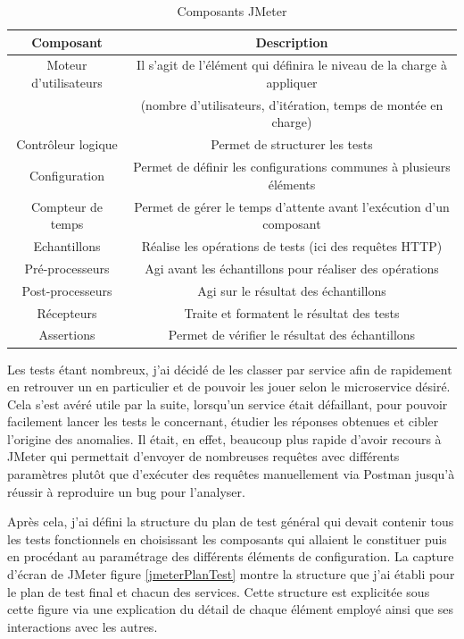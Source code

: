 \begin{table}[h!]
	\center
	\begin{tabular}{| c | c |}
     \hline
     Composant & Description \\ \hline
     Moteur d’utilisateurs & Il s’agit de l’élément qui définira le niveau de la charge à appliquer \\ & (nombre d’utilisateurs, d’itération, temps de montée en charge) \\ \hline
     Contrôleur logique & Permet de structurer les tests \\ \hline
     Configuration & Permet de définir les configurations communes à plusieurs éléments \\ \hline
     Compteur de temps & Permet de gérer le temps d’attente avant l’exécution d’un composant \\ \hline
     Echantillons & Réalise les opérations de tests (ici des requêtes HTTP) \\ \hline
     Pré-processeurs & Agi avant les échantillons pour réaliser des opérations \\ \hline
     Post-processeurs & Agi sur le résultat des échantillons \\ \hline
     Récepteurs & Traite et formatent le résultat des tests \\ \hline
     Assertions & Permet de vérifier le résultat des échantillons \\ \hline
	\end{tabular}
	\caption{Composants JMeter}
	\label{composantJMeter}
\end{table}
	
	Les tests étant nombreux, j’ai décidé de les classer par service afin de rapidement en retrouver un en particulier et de pouvoir les jouer selon le microservice désiré. Cela s'est avéré utile par la suite, lorsqu'un service était défaillant, pour pouvoir facilement lancer les tests le concernant, étudier les réponses obtenues et cibler l'origine des anomalies. Il était, en effet, beaucoup plus rapide d'avoir recours à JMeter qui permettait d'envoyer de nombreuses requêtes avec différents paramètres plutôt que d'exécuter des requêtes manuellement via Postman jusqu'à réussir à reproduire un bug pour l'analyser. 
	
	Après cela, j’ai défini la structure du plan de test général qui devait contenir tous les tests fonctionnels en choisissant les composants qui allaient le constituer puis en procédant au paramétrage des différents éléments de configuration. La capture d’écran de JMeter figure \ref{jmeterPlanTest} montre la structure que j’ai établi pour le plan de test final et chacun des services. Cette structure est explicitée sous cette figure via une explication du détail de chaque élément employé ainsi que ses interactions avec les autres. \\
	
